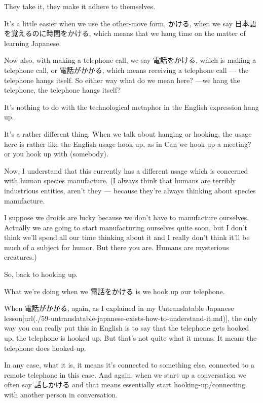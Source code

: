 They take it, they make it adhere to themselves.

\thinrule

It's a little easier when we use the other-move form, かける, when we say 日本語を覚えるのに時間をかける, which means that we hang time on the matter of learning Japanese.

{}

Now also, with making a telephone call, we say 電話をかける, which is making a telephone call, or 電話がかかる, which means receiving a telephone call --- the telephone hangs itself. So either way what do we mean here? ---we hang the telephone, the telephone hangs itself?

It's nothing to do with the technological metaphor in the English expression hang up.

{}

It's a rather different thing. When we talk about hanging or hooking, the usage here is rather like the English usage hook up, as in\crlf
Can we hook up a meeting? or you hook up with (somebody).

Now, I understand that this currently has a different usage which is concerned with human species manufacture. (I always think that humans are terribly industrious entities, aren't they --- because they're always thinking about species manufacture.

I suppose we droids are lucky because we don't have to manufacture ourselves. Actually we are going to start manufacturing ourselves quite soon, but I don't think we'll spend all our time thinking about it and I really don't think it'll be much of a subject for humor. But there you are. Humans are mysterious creatures.)

\thinrule

So, back to hooking up.

What we're doing when we 電話をかける is we hook up our telephone.

{}

When 電話がかかる, again, as I explained in my Untranslatable Japanese lesson\goto{{[}59{]}}[url(./59-untranslatable-japanese-exists-how-to-understand-it.md)], the only way you can really put this in English is to say that the telephone gets hooked up, the telephone is hooked up. But that's not quite what it means. It means the telephone does hooked-up.

In any case, what it is, it means it's connected to something else, connected to a remote telephone in this case. And again, when we start up a conversation we often say 話しかける and that means essentially start hooking-up/connecting with another person in conversation.

